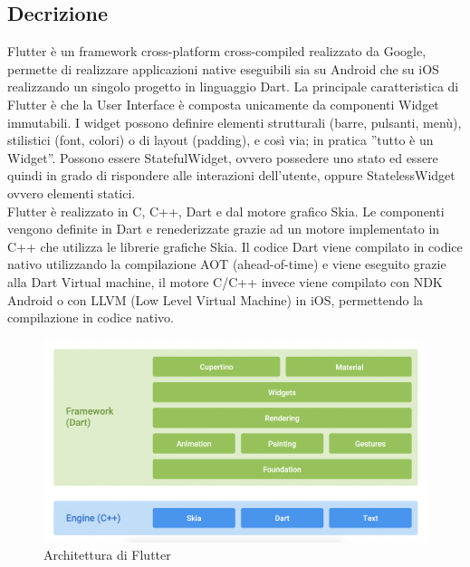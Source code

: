 \subsection{Decrizione\label{sec:flutter-descrizione}}
Flutter è un framework cross-platform cross-compiled realizzato da Google, permette di realizzare applicazioni native eseguibili sia su Android che su iOS realizzando un singolo progetto in linguaggio Dart. La principale caratteristica di Flutter è che la User Interface è composta unicamente da componenti Widget immutabili. I widget possono definire elementi strutturali (barre, pulsanti, menù), stilistici (font, colori) o di layout (padding), e così via; in pratica ''tutto è un Widget''. Possono essere StatefulWidget, ovvero possedere uno stato ed essere quindi in grado di rispondere alle interazioni dell'utente, oppure StatelessWidget ovvero elementi statici. 
\\Flutter è realizzato in C, C++, Dart e dal motore grafico Skia. Le componenti vengono definite in Dart e renederizzate grazie ad un motore implementato in C++ che utilizza le librerie grafiche Skia. Il codice Dart viene compilato in codice nativo utilizzando la compilazione AOT (ahead-of-time) e viene eseguito grazie alla Dart Virtual machine, il motore C/C++ invece viene compilato con NDK Android o con LLVM (Low Level Virtual Machine) in iOS, permettendo la compilazione in codice nativo.
\begin{figure}[H]
	\centering
	\captionsetup{justification=centering}
	\includegraphics[width=1\linewidth]{./immagini/flutter_architecture.png}
	\caption{Architettura di Flutter}
\end{figure}

